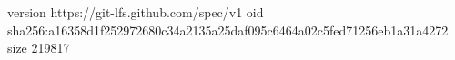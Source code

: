 version https://git-lfs.github.com/spec/v1
oid sha256:a16358d1f252972680c34a2135a25daf095c6464a02c5fed71256eb1a31a4272
size 219817
